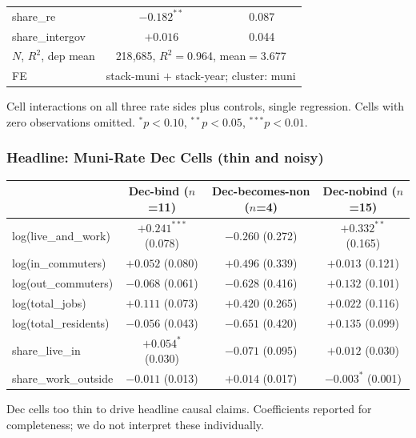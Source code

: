 \documentclass[xcolor = x11names, compress, aspectratio = 169]{beamer}
\begin{document}
\begin{frame}
\begin{tabular}{lcc}
            share\_re                                         & $\bm{-0.182^{**}}$  & 0.087 \\
            share\_intergov                                   & $+0.016$            & 0.044 \\
            \midrule
            $N$, $R^2$, dep mean & \multicolumn{2}{c}{218{,}685, $R^2=$0.964, mean$=$3.677} \\
            FE & \multicolumn{2}{c}{stack-muni $+$ stack-year; cluster: muni} \\
            \bottomrule
        \end{tabular}
        \vspace{0.05cm}
        \begin{minipage}{0.95\textwidth}
            \tiny Cell interactions on all three rate sides plus controls,
            single regression. Cells with zero observations omitted.
            $^{*}p<0.10$, $^{**}p<0.05$, $^{***}p<0.01$.
        \end{minipage}
    \end{frame}

    \begin{frame}
    \frametitle{Headline: Muni-Rate Dec Cells (thin and noisy)}
        \centering
        \scriptsize
        \renewcommand{\arraystretch}{1.10}
        \setlength{\tabcolsep}{4pt}
        \begin{tabular}{lccc}
            \toprule
            & Dec-bind ($n$=11) & Dec-becomes-non ($n$=4) & Dec-nobind ($n$=15) \\
            \midrule
            log(live\_and\_work)    & $+0.241^{***}$ (0.078) & $-0.260$ (0.272)        & $+0.332^{**}$ (0.165) \\
            log(in\_commuters)      & $+0.052$ (0.080)        & $+0.496$ (0.339)        & $+0.013$ (0.121) \\
            log(out\_commuters)     & $-0.068$ (0.061)        & $-0.628$ (0.416)        & $+0.132$ (0.101) \\
            log(total\_jobs)        & $+0.111$ (0.073)        & $+0.420$ (0.265)        & $+0.022$ (0.116) \\
            log(total\_residents)   & $-0.056$ (0.043)        & $-0.651$ (0.420)        & $+0.135$ (0.099) \\
            share\_live\_in         & $+0.054^{*}$ (0.030)    & $-0.071$ (0.095)        & $+0.012$ (0.030) \\
            share\_work\_outside    & $-0.011$ (0.013)        & $+0.014$ (0.017)        & $-0.003^{*}$ (0.001) \\
            \bottomrule
        \end{tabular}
        \vspace{0.10cm}
        \footnotesize
        Dec cells too thin to drive headline causal claims. Coefficients
        reported for completeness; we do not interpret these individually.
    \end{frame}
\end{document}

